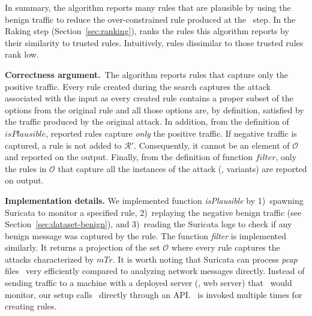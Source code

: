 \documentclass[conference]{IEEEtran}
\begin{document}
In summary, the algorithm reports many rules that are plausible by
using the benign traffic to reduce the over-constrained rule produced
at the \reveng\ step. In the Raking step (Section~\ref{sec:ranking}),
\tname{} ranks the rules this algorithm reports by their similarity to
trusted rules. Intuitively, rules dissimilar to those trusted rules
rank low.

\textbf{Correctness argument.}~The algorithm reports rules that
capture only the positive traffic. Every rule created during the
search captures the attack associated with the input as every created
rule contains a proper subset of the options from the original rule
and all those options are, by definition, satisfied by the traffic
produced by the original attack. In addition, from the definition of
$\mathit{isPlausible}$, reported rules capture \emph{only} the
positive traffic. If negative traffic is captured, a rule is not added
to $\mathcal R'$. Consequently, it cannot be an element of $\mathcal
O$ and reported on the output. Finally, from the definition of
function $\mathit{filter}$, only the rules in $\mathcal O$ that
capture all the instances of the attack (\ie{}, variants) are reported
on output.






\textbf{Implementation details.} We implemented function
\emph{isPlausible} by 1)~spawning Suricata to monitor a specified
rule, 2)~replaying the negative benign traffic (see
Section~\ref{sec:dataset-benign}), and 3)~reading the Suricata logs to
check if any benign message was captured by the rule. The function
\emph{filter} is implemented similarly. It returns a projection of the
set $\mathcal O$ where every rule captures the attacks characterized
by $\mathit{mTr}$. It is worth noting that Suricata can process
\emph{pcap} files~\cite{pcap} very efficiently compared to analyzing
network messages directly. Instead of sending traffic to a machine
with a deployed server (\eg{}, web server) that \suri\ would monitor,
our setup calls \suri\ directly through an API. \suri\ is invoked
multiple times for creating rules.
\end{document}
